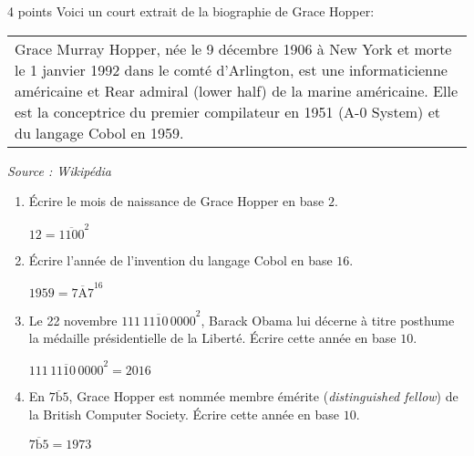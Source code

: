 \documentclass[a4paper,dvipsnames]{article}
\begin{document}
\begin{exercice}{4 points}{}
  Voici un court extrait de la biographie de Grace Hopper:

  \begin{center}
    \begin{tabular}{|p{12cm}}
      Grace Murray Hopper, née le 9 décembre 1906 à New York et morte le 1\ier{} janvier 1992 dans le comté d'Arlington, est une informaticienne américaine et Rear admiral (lower half) de la marine américaine. Elle est la conceptrice du premier compilateur en 1951 (A-0 System) et du langage Cobol en 1959.
    \end{tabular}

    \smallskip

    \begin{minipage}{12cm}
      \flushright\textit{Source : Wikipédia}
    \end{minipage}
  \end{center}

  \begin{enumerate}
    \item Écrire le mois de naissance de Grace Hopper en base $2$.

      \begin{correction}
	$12=\overline{1100}^2$ 
      \end{correction}
      
    \item Écrire l'année de l'invention du langage Cobol en base $16$.

      \begin{correction}
	$1959=\overline{7\text{A}7}^{16}$
      \end{correction}
      
    \item Le 22 novembre $\overline{111\,1110\,0000}^2$, Barack Obama lui décerne à titre posthume la médaille présidentielle de la Liberté. Écrire cette année en base $10$.

      \begin{correction}
        $\overline{111\,1110\,0000}^2=2016$
      \end{correction}
      
    \item En $\overline{7\text{b}5}$, Grace Hopper est nommée \og{}membre émérite\fg{} (\textit{distinguished fellow}) de la British Computer Society. Écrire  cette année en base $10$.

      \begin{correction}
        $\overline{7\text{b}5}=1973$
      \end{correction}
      
  \end{enumerate}
\end{exercice}
\end{document}
